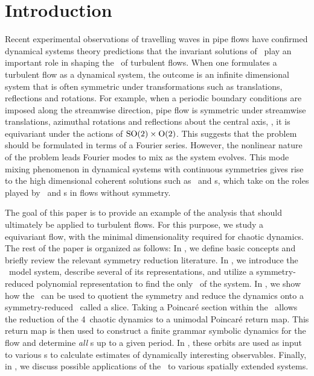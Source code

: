 \section{Introduction}
\label{s:intro}

Recent experimental observations of travelling waves in pipe flows have
confirmed dynamical systems theory predictions that the invariant
solutions of \NSe\ play an important role in shaping the \statesp\ of turbulent
flows. When one formulates a turbulent flow as a
dynamical system, the outcome is an infinite dimensional system that is often
symmetric under transformations such as translations,
reflections and rotations. For example, when a periodic boundary
conditions are imposed along the streamwise direction, pipe flow is symmetric
under streamwise translations, azimuthal rotations and reflections about
the central axis, \ie, it is equivariant under the actions of
$\textrm{SO}(2) \times \textrm{O}(2)$. This suggests that the problem should be formulated in
terms of a Fourier series. However, the nonlinear nature of the problem
leads Fourier modes to mix as the system evolves. This mode mixing phenomenon
in dynamical systems with continuous symmetries gives rise to the high 
dimensional coherent solutions such as \reqva\ and \rpo s, which take on the 
roles played by \eqva\ and \po s in flows without symmetry.

The goal of this paper is to provide an example of the analysis that should
ultimately be applied to turbulent flows. For this purpose, we study
a \twomode\  equivariant flow, with the minimal dimensionality required 
for chaotic dynamics. The rest of the paper is organized as follows:
In , we define basic concepts and briefly review the relevant 
symmetry reduction literature. In , we introduce the \twomode\ 
model system, describe several of its representations, and
utilize a symmetry-reduced polynomial representation to find the only \reqv\
of the system. In , we show how the \mslices\ can be used to quotient 
the symmetry and reduce the dynamics onto a symmetry-reduced \statesp\ called a slice. Taking a Poincar\'e 
section within the \slice\ allows the reduction of the 4\dmn\ chaotic dynamics to a unimodal Poincar\'e
return map. This return map is then used to construct a finite grammar symbolic dynamics for
the flow and determine {\em all} \rpo s up to a given period. In \refsect{s:DynAvers},
these orbits are used as input to various {\cycForm s} to calculate estimates
of dynamically interesting observables. Finally, in \refsect{s:concl}, we discuss possible 
applications of the \mslices\ to various spatially extended systems. 

